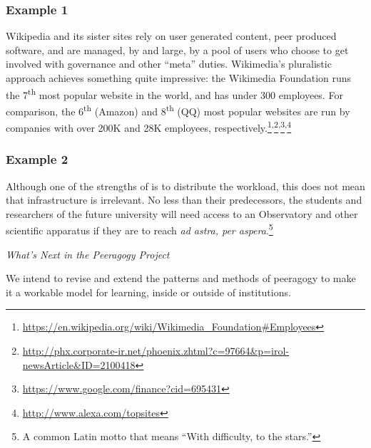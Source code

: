 \subsubsection*{Example 1} Wikipedia and its sister sites rely on user generated content,
peer produced software, and are managed, by and large, by a pool of users who choose to
get involved with governance and other ``meta'' duties.
%
Wikimedia's pluralistic approach achieves something quite impressive: the
Wikimedia Foundation runs the 7\textsuperscript{th} most popular
website in the world, and has under 300 employees.  For comparison,
the 6\textsuperscript{th} (Amazon) and 8\textsuperscript{th} (QQ) most popular
websites are run by companies with over 200K and 28K employees,
respectively.\footnote{\url{https://en.wikipedia.org/wiki/Wikimedia_Foundation\#Employees}}\textsuperscript{,}\footnote{\url{http://phx.corporate-ir.net/phoenix.zhtml?c=97664&p=irol-newsArticle&ID=2100418}}\textsuperscript{,}\footnote{\url{https://www.google.com/finance?cid=695431}}\textsuperscript{,}\footnote{\url{http://www.alexa.com/topsites}}

\subsubsection*{Example 2} Although one of the strengths of  is to
distribute the workload, this does not mean that infrastructure is
irrelevant.  No less than their predecessors, the students and
researchers of the future university will need access to an
Observatory and other scientific apparatus if they are to
reach \emph{ad astra, per aspera}.\footnote{A common Latin motto that means ``With difficulty, to the stars.''}

\begin{framed}
\noindent 
\emph{What's Next in the Peeragogy Project}
\begin{collectinmacro}{\PeeragogyWN}{}{}
We intend to revise and extend the patterns and methods of peeragogy to make it a workable model for learning, inside or outside of institutions.
\end{collectinmacro}
\PeeragogyWN
\end{framed}



  

  
  
  
  
  
  
  
